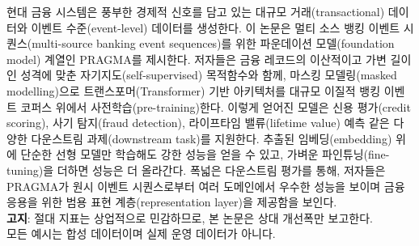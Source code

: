 현대 금융 시스템은 풍부한 경제적 신호를 담고 있는 대규모 거래(transactional) 데이터와 이벤트 수준(event-level) 데이터를 생성한다.
이 논문은 멀티 소스 뱅킹 이벤트 시퀀스(multi-source banking event sequences)를 위한 파운데이션 모델(foundation model) 계열인 PRAGMA를 제시한다.
저자들은 금융 레코드의 이산적이고 가변 길이인 성격에 맞춘 자기지도(self-supervised) 목적함수와 함께, 마스킹 모델링(masked modelling)으로 트랜스포머(Transformer) 기반 아키텍처를 대규모 이질적 뱅킹 이벤트 코퍼스 위에서 사전학습(pre-training)한다.
이렇게 얻어진 모델은 신용 평가(credit scoring), 사기 탐지(fraud detection), 라이프타임 밸류(lifetime value) 예측 같은 다양한 다운스트림 과제(downstream task)를 지원한다. 추출된 임베딩(embedding) 위에 단순한 선형 모델만 학습해도 강한 성능을 얻을 수 있고, 가벼운 파인튜닝(fine-tuning)을 더하면 성능은 더 올라간다.
폭넓은 다운스트림 평가를 통해, 저자들은 PRAGMA가 원시 이벤트 시퀀스로부터 여러 도메인에서 우수한 성능을 보이며 금융 응용을 위한 범용 표현 계층(representation layer)을 제공함을 보인다.\\

\textbf{고지}: 절대 지표는 상업적으로 민감하므로, 본 논문은 상대 개선폭만 보고한다.\\
모든 예시는 합성 데이터이며 실제 운영 데이터가 아니다.

